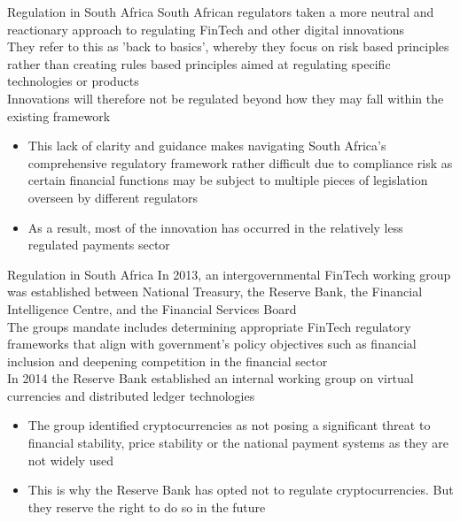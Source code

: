 \documentclass[10pt]{beamer}
\begin{document}
\begin{frame}{Regulation in South Africa}
	South African regulators taken a more neutral and reactionary approach to regulating FinTech and other digital innovations \\ \vspace{2mm}
	They refer to this as 'back to basics', whereby they focus on risk based principles rather than creating rules based principles aimed at regulating specific technologies or products\\ \vspace{2mm}
	Innovations will therefore not be regulated beyond how they may fall within the existing framework
	\begin{itemize}
		\item This lack of clarity and guidance makes navigating South Africa's comprehensive regulatory framework rather difficult due to compliance risk as certain financial functions may be subject to multiple pieces of legislation overseen by different regulators
		\item As a result, most of the innovation has occurred in the relatively less regulated payments sector
	\end{itemize}
\end{frame}


\begin{frame}{Regulation in South Africa}
	In 2013, an intergovernmental FinTech working group was established between National Treasury, the Reserve Bank, the Financial Intelligence Centre, and the Financial Services Board \\ \vspace{3mm}
	The groups mandate includes determining appropriate FinTech regulatory frameworks that align with government's policy objectives such as financial inclusion and deepening competition in the financial sector\\ \vspace{3mm}
	In 2014 the Reserve Bank established an internal working group on virtual currencies and distributed ledger technologies
	\begin{itemize}
		\item The group identified cryptocurrencies as not posing a significant threat to financial stability, price stability or the national payment systems as they are not widely used
		\item This is why the Reserve Bank has opted not to regulate cryptocurrencies. But they reserve the right to do so in the future
	\end{itemize}
\end{frame}
\end{document}
